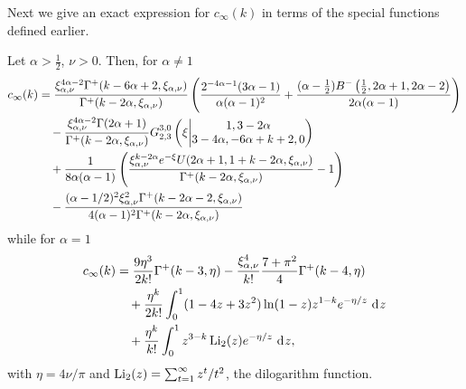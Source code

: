 Next we give an exact expression for $c_\infty(k)$ in terms of the special functions defined earlier.

\begin{theorem}
\label{thm:exact_expression_local_clustering}
Let $\alpha > \frac{1}{2}$, $\nu > 0$. Then, for $\alpha \ne 1$
\begin{align*}
	c_\infty(k) 
	&= \frac{\xi_{\alpha,\nu}^{4\alpha - 2}\Gamma^+(k-6\alpha + 2,\xi_{\alpha,\nu})}{\Gamma^+(k-2\alpha,\xi_{\alpha,\nu})}
		\left(\frac{2^{-4\alpha - 1}(3\alpha - 1)}{\alpha(\alpha - 1)^2} + \frac{(\alpha - \frac{1}{2})B^-\left(\frac{1}{2},2\alpha + 1, 2\alpha - 2\right)}{2\alpha(\alpha - 1)}\right)\\
	&\hspace{10pt}- \frac{\xi_{\alpha,\nu}^{4\alpha - 2}\Gamma(2\alpha + 1)}{\Gamma^+(k-2\alpha,\xi_{\alpha,\nu})}
		\MeijerGnew{3}{0}{2}{3}{1,3-2\alpha}{3-4\alpha,-6\alpha+k+2,0}{\xi}\\
	&\hspace{10pt}+ \frac{1}{8\alpha(\alpha - 1)}
		\left(\frac{\xi_{\alpha,\nu}^{k-2\alpha}e^{-\xi}U(2\alpha+1,1+k-2\alpha,\xi_{\alpha,\nu})}
		{\Gamma^+(k-2\alpha,\xi_{\alpha,\nu})}-1\right)\\
	&\hspace{10pt}- \frac{(\alpha - 1/2)^2 \xi_{\alpha,\nu}^2 \Gamma^+(k-2\alpha -2,\xi_{\alpha,\nu})}
		{4(\alpha - 1)^2 \Gamma^+(k-2\alpha,\xi_{\alpha,\nu})}
\end{align*}
while for $\alpha = 1$
\begin{align*}
	c_\infty(k) &= \frac{9 \eta^3}{2 k!} 	
		\Gamma^+(k-3,\eta)-\frac{\xi_{\alpha,\nu}^4}{k!}\frac{7+\pi^2}{4}\Gamma^+(k-4,\eta)\\
	&\hspace{10pt}+ \frac{\eta^k}{2k!}\int_0^1 (1-4z+3z^2)\ln(1-z)z^{1-k}e^{-\eta/z}\dd z\\ 
	&\hspace{10pt}+ \frac{\eta^k}{k!}\int_0^1 z^{3-k} \Li_2(z) e^{-\eta/z} \dd z,
\end{align*}
with $\eta = 4\nu/\pi$ and $\Li_2(z) = \sum_{t = 1}^\infty z^t/t^2$, the dilogarithm function.
\end{theorem}

